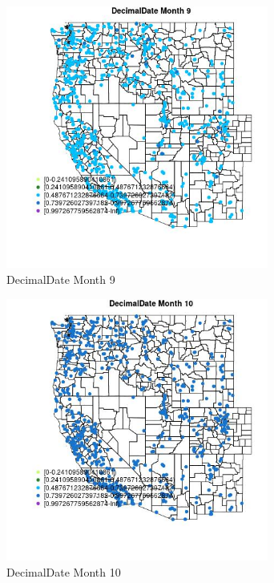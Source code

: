 \begin{figure} 
\centering  
\includegraphics[width=0.77\textwidth]{Code_Outputs/Report_ML_input_PM25_Step4_part_e_de_duplicated_aveswNAs_MapObsMo9DecimalDate.jpg} 
\caption{\label{fig:Report_ML_input_PM25_Step4_part_e_de_duplicated_aveswNAsMapObsMo9DecimalDate}DecimalDate Month 9} 
\end{figure} 
 

\clearpage 

\begin{figure} 
\centering  
\includegraphics[width=0.77\textwidth]{Code_Outputs/Report_ML_input_PM25_Step4_part_e_de_duplicated_aveswNAs_MapObsMo10DecimalDate.jpg} 
\caption{\label{fig:Report_ML_input_PM25_Step4_part_e_de_duplicated_aveswNAsMapObsMo10DecimalDate}DecimalDate Month 10} 
\end{figure} 
 

